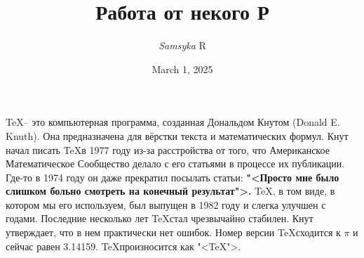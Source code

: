 \documentclass[a4paper, 12pt]{article}
\title{Работа от некого Р}
\author{\textit{Samsyka} R}
\date{March 1, 2025}
\begin{document}
\maketitle 
\TeX \--- это компьютерная программа, созданная Дональдом Кнутом (Donald E. Knuth). Она предназначена для вёрстки текста и математических формул. Кнут начал писать \TeX в 1977 году из-за расстройства от того, что Американское Математическое Сообщество делало с его статьями в процессе их публикации. Где-то в 1974 году он даже прекратил посылать статьи: \textbf{"<Просто мне было слишком больно смотреть на конечный результат">.} \TeX, в том виде, в котором мы его используем, был выпущен в 1982 году и слегка улучшен с годами. Последние несколько лет \TeX стал чрезвычайно стабилен. Кнут утверждает, что в нем практически нет ошибок. Номер версии \TeX сходится к $\pi$ и сейчас равен 3.14159. \TeX произносится как "<\TeX">.
\end{document}
